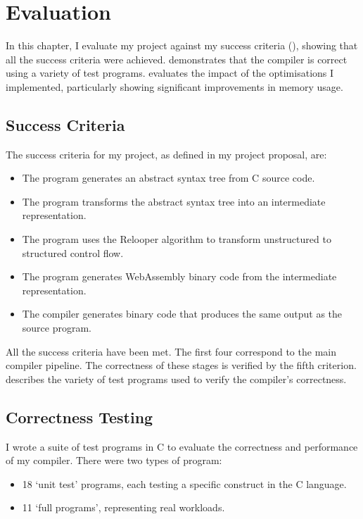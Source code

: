 \documentclass[00-main.tex]{subfiles}
\begin{document}
\chapter{Evaluation}

\newcommand{\IncludeStackPlot}[1]{\resizebox{0.98\textwidth}{!}{}}

In this chapter, I evaluate my project against my success criteria (), showing that all the success criteria were achieved.
 demonstrates that the compiler is correct using a variety of test programs.
 evaluates the impact of the optimisations I implemented, particularly showing significant improvements in memory usage.


\section{Success Criteria}\label{sec:eval:success criteria}

The success criteria for my project, as defined in my project proposal, are:
\begin{itemize}[nosep, itemsep=2pt]
\item The program generates an abstract syntax tree from C source code.
\item The program transforms the abstract syntax tree into an intermediate representation.
\item The program uses the Relooper algorithm to transform unstructured to structured control
flow.
\item The program generates WebAssembly binary code from the intermediate representation.
\item The compiler generates binary code that produces the same output as the source program.
\end{itemize}

All the success criteria have been met.
The first four correspond to the main compiler pipeline.
The correctness of these stages is verified by the fifth criterion.
 describes the variety of test programs used to verify the compiler's correctness.


\section{Correctness Testing}\label{sec:eval:correctness testing}

I wrote a suite of test programs in C to evaluate the correctness and performance of my compiler.
There were two types of program:
\begin{itemize}[nosep, itemsep=2pt]
\item 18 `unit test' programs, each testing a specific construct in the C language.
\item 11 `full programs', representing real workloads.
\end{itemize}
\end{document}
